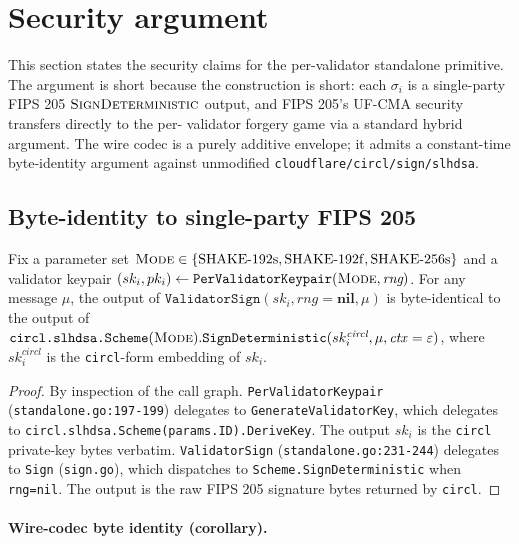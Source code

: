\section{Security argument}
\label{sec:security}

This section states the security claims for the per-validator
standalone primitive. The argument is short because the construction
is short: each $\sigma_i$ is a single-party FIPS 205
$\textsc{SignDeterministic}$ output, and FIPS 205's UF-CMA
security \cite{fips205,sphincs} transfers directly to the per-
validator forgery game via a standard hybrid argument. The wire
codec is a purely additive envelope; it admits a constant-time
byte-identity argument against unmodified
\texttt{cloudflare/circl/sign/slhdsa}.

\subsection{Byte-identity to single-party FIPS 205}
\label{sec:security:byte-equality}

\begin{theorem}
\label{thm:magnetar-byte-equality}
Fix a parameter set $\textsc{Mode} \in \{\mathrm{SHAKE\text{-}192s},
\mathrm{SHAKE\text{-}192f},
\mathrm{SHAKE\text{-}256s}\}$ and a validator keypair
$(sk_i, pk_i) \gets \texttt{PerValidatorKeypair}(\textsc{Mode},
\textit{rng})$. For any message $\mu$, the output of
$\texttt{ValidatorSign}(sk_i, \textit{rng}=\textbf{nil}, \mu)$ is
byte-identical to the output of
$\texttt{circl.slhdsa.Scheme}(\textsc{Mode}).
\texttt{SignDeterministic}(sk_i^{\textit{circl}}, \mu,
\mathit{ctx}=\varepsilon)$, where $sk_i^{\textit{circl}}$ is the
\texttt{circl}-form embedding of $sk_i$.
\end{theorem}

\begin{proof}
By inspection of the call graph.
\texttt{PerValidatorKeypair} (\texttt{standalone.go:197-199})
delegates to \texttt{GenerateValidatorKey}, which delegates to
\texttt{circl.slhdsa.Scheme(params.ID).DeriveKey}. The output
$sk_i$ is the \texttt{circl} private-key bytes verbatim.
\texttt{ValidatorSign} (\texttt{standalone.go:231-244}) delegates
to \texttt{Sign} (\texttt{sign.go}), which dispatches to
\texttt{Scheme.SignDeterministic} when \texttt{rng=nil}. The output
is the raw FIPS 205 signature bytes returned by \texttt{circl}.
\end{proof}

\paragraph{Wire-codec byte identity (corollary).}

